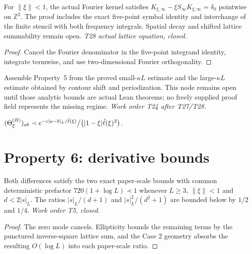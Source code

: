 \begin{lemma}
  \label{lem:periodize-integrand}
  \leanok
  For $\|\xi\|<1$, the actual Fourier kernel satisfies
  $K_{\xi,\infty}-\xi S_\infty K_{\xi,\infty}=\delta_0$ pointwise on
  $\mathbb Z^2$. The proof includes the exact five-point symbol identity
  and interchange of the finite stencil with both frequency integrals.
  Spatial decay and shifted lattice summability remain open.
  \emph{T28 actual lattice equation, closed.}
\end{lemma}
\begin{proof}\leanok
  Cancel the Fourier denominator in the five-point integrand identity,
  integrate termwise, and use two-dimensional Fourier orthogonality.
\end{proof}

\begin{lemma}\label{lem:decay-interface}
  Assemble Property~5 from the proved small-$\kappa L$ estimate and the
  large-$\kappa L$ estimate obtained by contour shift and periodization.
  This node remains open until those analytic bounds are actual Lean theorems;
  no freely supplied proof field represents the missing regime.
  \emph{Work order T24 after T27/T28.}
\end{lemma}

\begin{lemma}\label{lem:propTH-5}
  $(\Theta^{(B)}_\xi)_{ab}\prec e^{-c|a-b|_L/\hat\ell(\xi)}\big/\big(|1-\xi|\hat\ell(\xi)^2\big)$.
\end{lemma}

\section{Property 6: derivative bounds}

\begin{lemma}[Case 2: $|s|_L>d/2$]\label{lem:bd-case2}
  \leanok
  Both differences satisfy the two exact paper-scale bounds with common
  deterministic prefactor $720(1+\log L)\prec1$ whenever $L\ge3$,
  $\|\xi\|<1$ and $d<2|s|_L$.  The ratios $|s|_L/(d+1)$ and
  $|s|_L^2/(d^2+1)$ are bounded below by $1/2$ and $1/4$.
  \emph{Work order T5, closed.}
\end{lemma}
\begin{proof}\leanok
  The zero mode cancels.  Ellipticity bounds the remaining terms by the
  punctured inverse-square lattice sum, and the Case 2 geometry absorbs the
  resulting $O(\log L)$ into each paper-scale ratio.
\end{proof}

